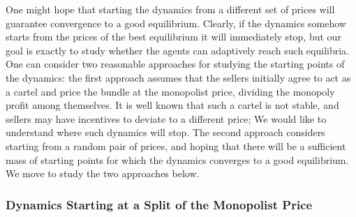 \documentclass[11pt,a4paper]{article}
\begin{document}
One might hope that starting the dynamics from a different set of prices will guarantee convergence to a good equilibrium.
Clearly, if the dynamics somehow starts from the prices of the best equilibrium it will immediately stop, but our goal is exactly to study whether the agents can adaptively reach such equilibria. %
One can consider two reasonable approaches for studying the starting points of the dynamics: the first approach assumes that the sellers initially agree to act as a cartel and price the bundle at the monopolist price, dividing the monopoly profit among themselves. It is well known that such a cartel is not stable, and sellers may have  incentives to deviate to a different price; We would like to understand where such dynamics will stop.
The second approach considers starting from a random pair of prices, and hoping that there will be a sufficient mass of starting points for which the dynamics converges to a good equilibrium. We move to study the two approaches below.


\subsubsection{Dynamics Starting at a Split of the Monopolist Price }
\end{document}
